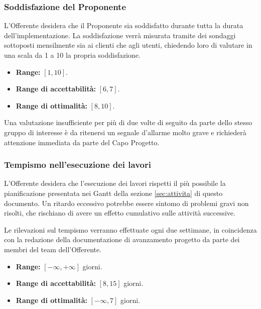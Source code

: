             \subsubsection{Soddisfazione del Proponente}
            	L'Offerente desidera che il Proponente sia soddisfatto durante tutta la durata dell'implementazione. La soddisfazione verrà misurata tramite dei sondaggi sottoposti mensilmente sia ai clienti che agli utenti, chiedendo loro di valutare in una scala da 1 a 10 la propria soddisfazione.
            	\begin{itemize}
            		\item \textbf{Range:} $[1, 10]$.
                    \item \textbf{Range di accettabilità:} $[6, 7]$.
                    \item \textbf{Range di ottimalità:} $[8, 10]$.
            	\end{itemize}
                Una valutazione insufficiente per più di due volte di seguito da parte dello stesso gruppo di interesse è da ritenersi un segnale d'allarme molto grave e richiederà attenzione immediata da parte del Capo Progetto.
			
            \subsubsection{Tempismo nell'esecuzione dei lavori}
            	L'Offerente desidera che l'esecuzione dei lavori rispetti il più possibile la pianificazione presentata nei Gantt della sezione \ref{sec:attivita} di questo documento. Un ritardo eccessivo potrebbe essere sintomo di problemi gravi non risolti, che rischiano di avere un effetto cumulativo sulle attività successive.
                
                
                Le rilevazioni sul tempismo verranno effettuate ogni due settimane, in coincidenza con la redazione della documentazione di avanzamento progetto da parte dei membri del team dell'Offerente.
                \begin{itemize}
            		\item \textbf{Range:} $[-\infty, +\infty]$ giorni.
                    \item \textbf{Range di accettabilità:} $[8,15]$ giorni.
                    \item \textbf{Range di ottimalità:} $[-\infty, 7]$ giorni.
            	\end{itemize}
                
                
